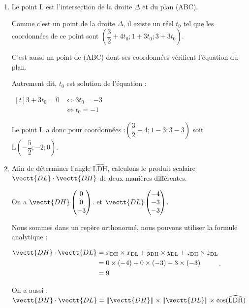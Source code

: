 \begin{enumerate}
\begin{enumerate}
		
		
	\end{enumerate}
	
	
	\item Le point L  est l'intersection de la droite $\Delta$ et du plan (ABC).
	
	Comme c'est un point de la droite $\Delta$, il existe un réel $t_0$ tel que les coordonnées de ce point sont $\left( \dfrac{3}{2} + 4t_0 ; 1+3t_0 ; 3+3t_0 \right) $.
	
	C'est aussi un point de (ABC) dont ses coordonnées vérifient l'équation du plan.
	
	Autrement dit, $t_0$ est solution de l'équation :
	
	$\begin{aligned}[t]
		 3 + 3t_0  = 0
		&\iff 3t_0 = -3 \\
		&\iff t_0 = -1
	\end{aligned}$
	
	Le point L a donc pour coordonnées :\quad $\left( \dfrac{3}{2} - 4  ; 1-3  ; 3-3  \right) $ \quad  soit $\mathrm{L}\left(-\dfrac{5}{2} ; -2 ; 0\right) $.

	
	\item  Afin de déterminer l'angle $\widehat{\mathrm{LDH}}$, calculons le produit scalaire $\vectt{DL} \cdot \vectt{DH}$ de deux manières différentes. 
	
On a  $\vectt{DH} \begin{pmatrix} 0 \\ 0\\ -3\end{pmatrix} $.
	\quad et  \quad $\vectt{DL} \begin{pmatrix} -4  \\ -3\\ -3 \end{pmatrix} $.
	
	
	
	Nous sommes dans un repère orthonormé, nous pouvons utiliser la formule analytique : 
	
	$\begin{aligned}  \vectt{DH} \cdot \vectt{DL} &= x_{\mathrm{DH}}\times x_{\mathrm{DL}} + y_{\mathrm{DH}}\times y_{\mathrm{DL}} +z_{\mathrm{DH}}\times z_{\mathrm{DL}}\\
		&= 0\times (-4) + 0 \times (-3) -3 \times (-3)\\
		&= 9
		\end{aligned}$. 
		
		
		
		
		On a aussi : 
$	\vectt{DH} \cdot \vectt{DL}=\left\|\vectt{DH}\right\|\times\left\|\vectt{DL}\right\|\times \cos(\widehat{\mathrm{LDH}})$


\end{enumerate}

